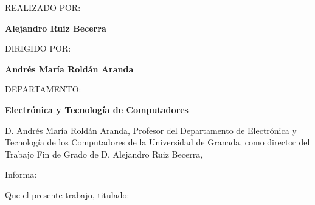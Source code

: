 \begin{center}
\vspace*{0.3cm}
\par\end{center}

\begin{center}
REALIZADO POR:
\par\end{center}

\begin{center}
\textbf{Alejandro Ruiz Becerra}
\par\end{center}

\begin{center}
DIRIGIDO POR:
\par\end{center}

\begin{center}
\textbf{Andrés María Roldán Aranda}
\par\end{center}

\begin{center}
DEPARTAMENTO:
\par\end{center}

\begin{center}
\textbf{Electrónica y Tecnología de Computadores}
\par\end{center}

\begin{center}
\vfill
\par\end{center}

\vspace*{1.5cm}

\newpage
\thispagestyle{empty}
\noindent
\blankpage

\clearpage
\thispagestyle{empty}
{}

\noindent D. Andrés María Roldán Aranda, Profesor del Departamento
de Electrónica y Tecnología de los Computadores de la Universidad
de Granada, como director del Trabajo Fin de Grado de D. Alejandro Ruiz Becerra,

\vspace*{1cm}

Informa:

\begin{doublespace}
Que el presente trabajo, titulado:
\end{doublespace}

